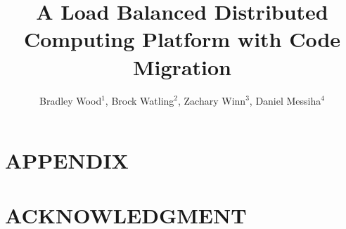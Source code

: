 \documentclass[letterpaper, 11 pt, conference]{ieeeconf}
\title{A Load Balanced Distributed Computing Platform with Code Migration}
\author{Bradley Wood$^{1}$, Brock Watling$^{2}$, Zachary Winn$^{3}$, Daniel Messiha$^{4}$}
\begin{document}
    \maketitle
    \thispagestyle{empty}
    \pagestyle{empty}

    

    

    

    

    

    \addtolength{\textheight}{-12cm}   %

    \section*{APPENDIX}

    \section*{ACKNOWLEDGMENT}


    \begin{thebibliography}{99}

    \end{thebibliography}
\end{document}
